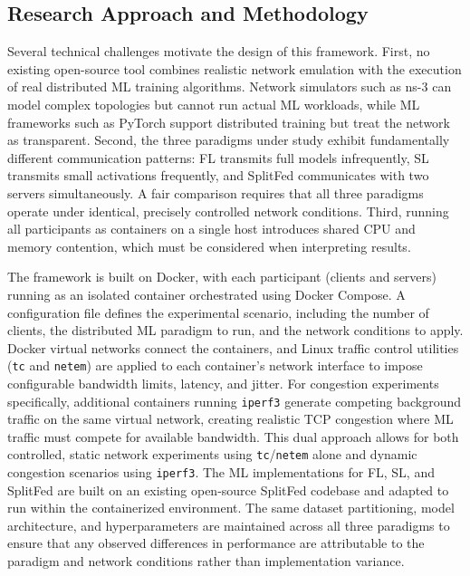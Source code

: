 \documentclass[12pt]{article}
\begin{document}
\subsection{Research Approach and Methodology}

Several technical challenges motivate the design of this framework. First, no existing open-source tool combines realistic network emulation with the execution of real distributed ML training algorithms. Network simulators such as ns-3 can model complex topologies but cannot run actual ML workloads, while ML frameworks such as PyTorch support distributed training but treat the network as transparent. Second, the three paradigms under study exhibit fundamentally different communication patterns: FL transmits full models infrequently, SL transmits small activations frequently, and SplitFed communicates with two servers simultaneously. A fair comparison requires that all three paradigms operate under identical, precisely controlled network conditions. Third, running all participants as containers on a single host introduces shared CPU and memory contention, which must be considered when interpreting results.

The framework is built on Docker, with each participant (clients and servers) running as an isolated container orchestrated using Docker Compose. A configuration file defines the experimental scenario, including the number of clients, the distributed ML paradigm to run, and the network conditions to apply. Docker virtual networks connect the containers, and Linux traffic control utilities (\texttt{tc} and \texttt{netem}) are applied to each container's network interface to impose configurable bandwidth limits, latency, and jitter. For congestion experiments specifically, additional containers running \texttt{iperf3} generate competing background traffic on the same virtual network, creating realistic TCP congestion where ML traffic must compete for available bandwidth. This dual approach allows for both controlled, static network experiments using \texttt{tc}/\texttt{netem} alone and dynamic congestion scenarios using \texttt{iperf3}. The ML implementations for FL, SL, and SplitFed are built on an existing open-source SplitFed codebase \cite{thapa2022} and adapted to run within the containerized environment. The same dataset partitioning, model architecture, and hyperparameters are maintained across all three paradigms to ensure that any observed differences in performance are attributable to the paradigm and network conditions rather than implementation variance.
\end{document}
